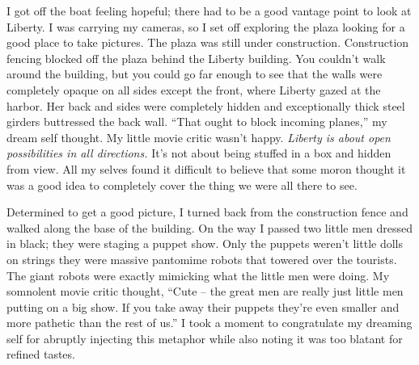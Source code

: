 I got off the boat feeling hopeful; there had to be a good vantage point
to look at Liberty. I was carrying my cameras, so I set off exploring
the plaza looking for a good place to take pictures. The plaza was still
under construction. Construction fencing blocked off the plaza behind
the Liberty building. You couldn't walk around the building, but you
could go far enough to see that the walls were completely opaque on all
sides except the front, where Liberty gazed at the harbor. Her back and
sides were completely hidden and exceptionally thick steel girders
buttressed the back wall. ``That ought to block incoming planes,'' my
dream self thought. My little movie critic wasn't happy. \emph{Liberty
is about open possibilities in all directions.} It's not about being
stuffed in a box and hidden from view. All my selves found it
difficult to believe that some moron thought it was a good idea to
completely cover the thing we were all there to see.

Determined to get a good picture, I turned back from the construction
fence and walked along the base of the building. On the way I passed two
little men dressed in black; they were staging a puppet show. Only the
puppets weren't little dolls on strings they were massive pantomime
robots that towered over the tourists. The giant robots were exactly
mimicking what the little men were doing. My somnolent movie critic
thought, ``Cute -- the great men are really just little men putting on a
big show. If you take away their puppets they're even smaller and more
pathetic than the rest of us.'' I took a moment to congratulate my
dreaming self for abruptly injecting this metaphor while also noting it
was too blatant for refined tastes.


